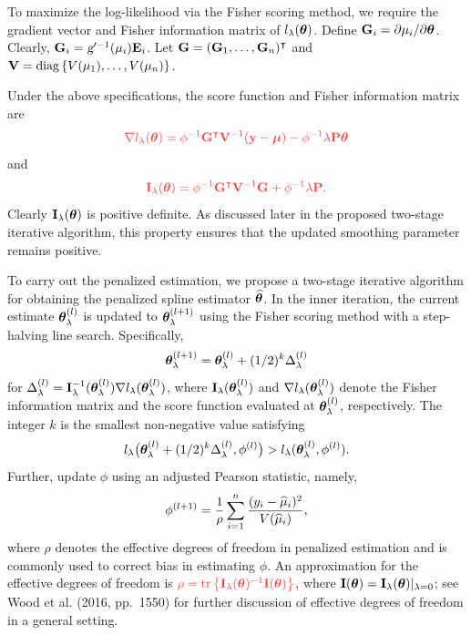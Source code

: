 To maximize the log-likelihood via the Fisher scoring method, we require the gradient vector and Fisher information matrix of $l_\lambda(\bm\theta)$. {\x Define $\mathbf{G}_i = \partial\mu_i/\partial\bm\theta$. Clearly, $\mathbf{G}_i = \textsl{g}^{\prime -1}(\mu_i)\mathbf{E}_i$. Let $\mathbf{G} = (\mathbf{G}_1,\ldots,\mathbf{G}_n)^\intercal$ and $\mathbf{V} = \text{diag}\left\{V(\mu_1),\ldots,V(\mu_n)\right\}$}. 


Under the above specifications, the score function and Fisher information matrix are
$$
\x\nabla l_\lambda(\Bt) = \phi^{-1}\BG^\p\BV^{-1}(\by-\Bm) - \phi^{-1}\lambda\BP\Bt
$$
and
$$
\x\BI_\lambda(\Bt) = \phi^{-1}\BG^\p\BV^{-1}\BG + \phi^{-1}\lambda\BP. 
$$
Clearly $\mathbf{I}_\lambda(\bm\theta)$ is positive definite. As discussed later in the proposed two-stage iterative algorithm, this property ensures that the updated smoothing parameter remains positive.

To carry out the penalized estimation, we propose a two-stage iterative algorithm for obtaining the penalized spline estimator $\widehat{\bm\theta}$. In the inner iteration, the current estimate $\bm\theta^{(l)}_\lambda$ is updated to $\bm\theta^{(l+1)}_\lambda$ using the Fisher scoring method with a step-halving line search. Specifically,
\begin{equation}
	\bm\theta^{(l+1)}_\lambda = \bm\theta^{(l)}_\lambda + (1/2)^k \Delta_\lambda^{(l)} \label{FS}
\end{equation}
for $\Delta_\lambda^{(l)} = \mathbf{I}_\lambda^{-1}(\bm\theta^{(l)}_\lambda)\nabla l_\lambda(\bm\theta^{(l)}_\lambda)$, where $\mathbf{I}_\lambda(\bm\theta^{(l)}_\lambda)$ and $\nabla l_\lambda(\bm\theta^{(l)}_\lambda)$ denote the Fisher information matrix and the score function evaluated at $\bm\theta^{(l)}_\lambda$, respectively. The integer $k$ is the smallest non-negative value satisfying
$$
l_\lambda\big(\bm\theta^{(l)}_\lambda + (1/2)^k \Delta_\lambda^{(l)}, \phi^{(l)}\big) > l_\lambda(\bm\theta^{(l)}_\lambda, \phi^{(l)}).
$$
Further, update $\phi$ using an adjusted Pearson statistic, namely,
\begin{equation}\label{sigma}
	\phi^{(l+1)} = \frac{1}{\rho}\sum_{i=1}^n \frac{(y_i - \widehat\mu_i)^2}{V(\widehat\mu_i)},
\end{equation}
where $\rho$ denotes the effective degrees of freedom in penalized estimation and is commonly used to correct bias in estimating $\phi$. An approximation for the effective degrees of freedom is $\x\rho = \mathrm{tr}\left\{\BI_\lambda(\Bt)^{-1}\BI(\Bt)\right\}$, where $\mathbf{I}(\bm\theta) = \mathbf{I}_\lambda(\bm\theta)\vert_{\lambda = 0}$; see Wood et al. (2016, pp.\ 1550) for further discussion of effective degrees of freedom in a general setting.

